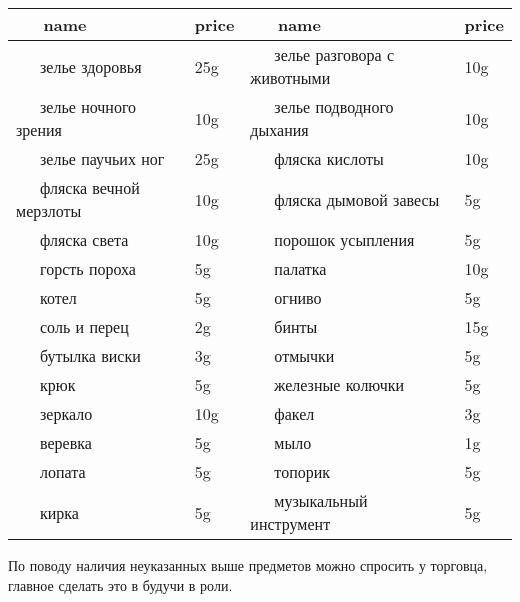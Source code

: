 \documentclass[a5paper,11pt]{book}
\begin{document}
\noindent
{}
\setlength\tabcolsep{0pt}
\setlength\LTleft{0pt}
\setlength\LTright{0pt}
\begin{longtable}{p{}P{0.1\textwidth}p{0.4\textwidth}P{0.1\textwidth}}
  \textbf{\ \ \ name}
  & \textbf{price}
  & \textbf{\ \ \ name}
  & \textbf{price}
  \\
  \hline
  \ \ \ зелье здоровья                  &  25g &
  \ \ \ зелье разговора с животными     &  10g \\
  \ \ \ зелье ночного зрения            &  10g &
  \ \ \ зелье подводного дыхания        &  10g \\
  \ \ \ зелье паучьих ног               &  25g &
  \ \ \ фляска кислоты                  &  10g \\
  \ \ \ фляска вечной мерзлоты          &  10g &
  \ \ \ фляска дымовой завесы           &   5g \\
  \ \ \ фляска света                    &  10g &
  \ \ \ порошок усыпления               &   5g \\
  \ \ \ горсть пороха                   &   5g &
  \ \ \ палатка                         &  10g \\
  \ \ \ котел                           &   5g &
  \ \ \ огниво                          &   5g \\
  \ \ \ соль и перец                    &   2g &
  \ \ \ бинты                           &  15g \\
  \ \ \ бутылка виски                   &   3g &
  \ \ \ отмычки                         &   5g \\
  \ \ \ крюк                            &   5g &
  \ \ \ железные колючки                &   5g \\
  \ \ \ зеркало                         &  10g &
  \ \ \ факел                           &   3g \\
  \ \ \ веревка                         &   5g &
  \ \ \ мыло                            &   1g \\
  \ \ \ лопата                          &   5g &
  \ \ \ топорик                         &   5g \\
  \ \ \ кирка                           &   5g &
  \ \ \ музыкальный инструмент          &   5g
  \\

\end{longtable}

По поводу наличия неуказанных выше предметов можно спросить у торговца, главное сделать это в будучи в роли.
\end{document}
